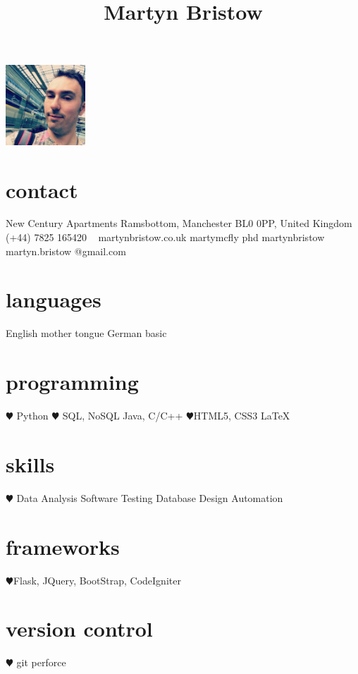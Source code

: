 \documentclass[]{cv-style}          %
\begin{document}
\lastupdated
\title{Martyn Bristow}


\begin{aside}
%
\includegraphics[width=3cm]{martyn-eurostar.jpg}
\section{contact}
 New Century Apartments
\hspace*{25pt} Ramsbottom, Manchester
\hspace*{25pt} BL0 0PP,
\hspace*{25pt} United Kingdom
~
\faPhone (+44) 7825 165420
~
{\faGlobe martynbristow.co.uk}
{\faTwitter martymcfly phd}
{\faGithub martynbristow}
{\faEnvelope martyn.bristow
@gmail.com}
\section{languages}
English mother tongue
German basic
%
\section{programming}
{\color{red} $\varheartsuit$} Python
{\color{red} $\varheartsuit$} SQL, NoSQL
Java, C/C++
{\color{red} $\varheartsuit$}HTML5, CSS3 \LaTeX{}
\section{skills}
{\color{red} $\varheartsuit$} Data Analysis
Software Testing
Database Design
Automation
\section{frameworks}
{\color{red} $\varheartsuit$}Flask, JQuery, BootStrap, CodeIgniter
\section{version control}
{\color{red} $\varheartsuit$} git perforce

\end{aside}
\end{document}
